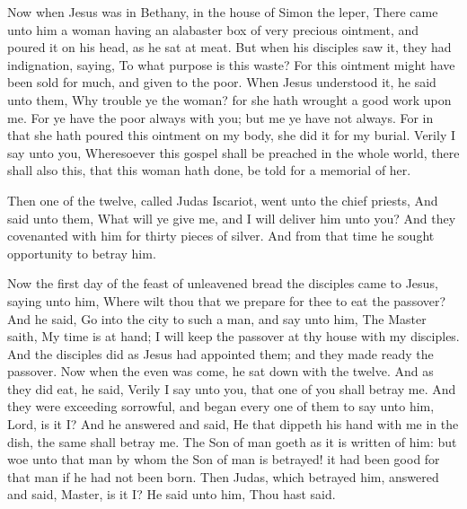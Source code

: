  Now when Jesus was in Bethany, in the house of Simon the
leper,  There came unto him a woman having an alabaster
box of very precious ointment, and poured it on his head, as he sat at
meat.  But when his disciples saw it, they had
indignation, saying, To what purpose is this waste?  For
this ointment might have been sold for much, and given to the poor.
 When Jesus understood it, he said unto them, Why trouble
ye the woman? for she hath wrought a good work upon me. 
For ye have the poor always with you; but me ye have not always.
 For in that she hath poured this ointment on my body,
she did it for my burial.  Verily I say unto you,
Wheresoever this gospel shall be preached in the whole world, there
shall also this, that this woman hath done, be told for a memorial of
her.

 Then one of the twelve, called Judas Iscariot, went unto
the chief priests,  And said unto them, What will ye give
me, and I will deliver him unto you? And they covenanted with him for
thirty pieces of silver.  And from that time he sought
opportunity to betray him.

 Now the first day of the feast of unleavened bread the
disciples came to Jesus, saying unto him, Where wilt thou that we
prepare for thee to eat the passover?  And he said, Go
into the city to such a man, and say unto him, The Master saith, My time
is at hand; I will keep the passover at thy house with my disciples.
 And the disciples did as Jesus had appointed them; and
they made ready the passover.  Now when the even was
come, he sat down with the twelve.  And as they did eat,
he said, Verily I say unto you, that one of you shall betray me.
 And they were exceeding sorrowful, and began every one
of them to say unto him, Lord, is it I?  And he answered
and said, He that dippeth his hand with me in the dish, the same shall
betray me.  The Son of man goeth as it is written of him:
but woe unto that man by whom the Son of man is betrayed! it had been
good for that man if he had not been born.  Then Judas,
which betrayed him, answered and said, Master, is it I? He said unto
him, Thou hast said.

